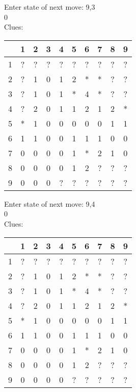 Enter state of next move: 9,3\\
0\\
Clues:\\
\begin{tabular}{|c|c|c|c|c|c|c|c|c|c|}
\hline
  & 1 & 2 & 3 & 4 & 5 & 6 & 7 & 8 & 9\\
\hline
1 & ? & ? & ? & ? & ? & ? & ? & ? & ?\\
\hline
2 & ? & 1 & 0 & 1 & 2 & * & * & ? & ?\\
\hline
3 & ? & 1 & 0 & 1 & * & 4 & * & ? & ?\\
\hline
4 & ? & 2 & 0 & 1 & 1 & 2 & 1 & 2 & *\\
\hline
5 & * & 1 & 0 & 0 & 0 & 0 & 0 & 1 & 1\\
\hline
6 & 1 & 1 & 0 & 0 & 1 & 1 & 1 & 0 & 0\\
\hline
7 & 0 & 0 & 0 & 0 & 1 & * & 2 & 1 & 0\\
\hline
8 & 0 & 0 & 0 & 0 & 1 & 2 & ? & ? & ?\\
\hline
9 & 0 & 0 & 0 & ? & ? & ? & ? & ? & ?\\
\hline
\end{tabular}

Enter state of next move: 9,4\\
0\\
Clues:\\
\begin{tabular}{|c|c|c|c|c|c|c|c|c|c|}
\hline
  & 1 & 2 & 3 & 4 & 5 & 6 & 7 & 8 & 9\\
\hline
1 & ? & ? & ? & ? & ? & ? & ? & ? & ?\\
\hline
2 & ? & 1 & 0 & 1 & 2 & * & * & ? & ?\\
\hline
3 & ? & 1 & 0 & 1 & * & 4 & * & ? & ?\\
\hline
4 & ? & 2 & 0 & 1 & 1 & 2 & 1 & 2 & *\\
\hline
5 & * & 1 & 0 & 0 & 0 & 0 & 0 & 1 & 1\\
\hline
6 & 1 & 1 & 0 & 0 & 1 & 1 & 1 & 0 & 0\\
\hline
7 & 0 & 0 & 0 & 0 & 1 & * & 2 & 1 & 0\\
\hline
8 & 0 & 0 & 0 & 0 & 1 & 2 & ? & ? & ?\\
\hline
9 & 0 & 0 & 0 & 0 & ? & ? & ? & ? & ?\\
\hline
\end{tabular}

